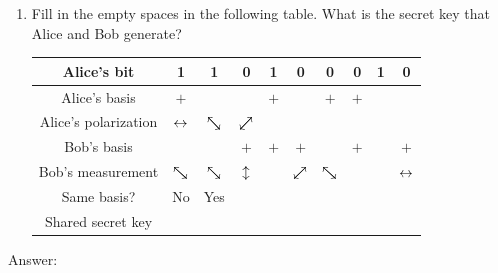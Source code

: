 \documentclass[12pt]{article}
\begin{document}
\begin{enumerate}[label=\textbf{\alph*.}]
    \item Fill in the empty spaces in the following table. What is the secret key that Alice and Bob generate?
    
    
    \begin{table}
    \begin{threeparttable}
    \centering
    \begin{tabular}{c||c|c|c|c|c|c|c|c|c}
        Alice's bit &
        1 & 1 & 0 & 1 & 0 & 0 & 0 & 1 & 0 \\
        \hline\hline
        Alice's basis &
        $+$ & \X & \X & $+$ & \X & $+$ & $+$ & \X & \X \\
        \hline
        Alice's polarization &
        $\leftrightarrow$ & $\Done$ & $\Dzero$ & &  &  &  &  &  \\
        \hline
        Bob's basis &
        \X & \X & $+$ & $+$ & $+$ & \X & $+$ & \X & $+$ \\
        \hline
        Bob's measurement &
        $\Done$ & $\Done$ & $\updownarrow$ &  &
        {$\Dzero$} & $\Done$ &  &  & $\leftrightarrow$ \\
        \hline
        Same basis? &
        No & Yes &  &  &  &  &  &  & \\
        \hline\hline
        Shared secret key & 
        &  & &  & & & &  &
    \end{tabular}
    
    \end{threeparttable}
    \end{table}
    
\end{enumerate}




Answer:
\end{document}
